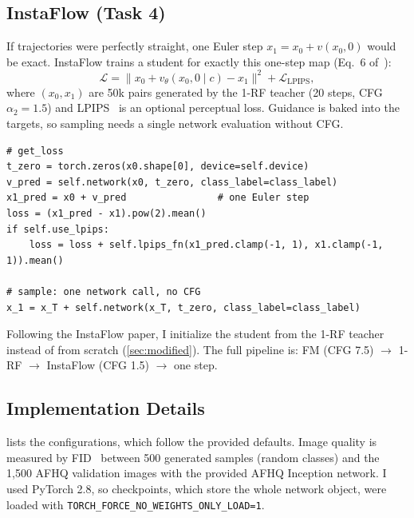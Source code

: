 \subsection{InstaFlow (Task 4)}
\label{sec:instaflow}
If trajectories were perfectly straight, one Euler step $x_1=x_0+v(x_0,0)$ would be exact.
InstaFlow trains a student for exactly this one-step map (Eq.~6 of~\cite{liu2024instaflow}):
\begin{equation}
  \mathcal L = \big\|x_0 + v_\theta(x_0,0\mid c) - x_1\big\|^2 + \mathcal L_{\text{LPIPS}},
\end{equation}
where $(x_0,x_1)$ are 50k pairs generated by the 1-RF teacher (20 steps, CFG $\alpha_2=1.5$) and LPIPS~\cite{zhang2018lpips} is an optional perceptual loss.
Guidance is baked into the targets, so sampling needs a single network evaluation without CFG.
\begin{lstlisting}
# get_loss
t_zero = torch.zeros(x0.shape[0], device=self.device)
v_pred = self.network(x0, t_zero, class_label=class_label)
x1_pred = x0 + v_pred                # one Euler step
loss = (x1_pred - x1).pow(2).mean()
if self.use_lpips:
    loss = loss + self.lpips_fn(x1_pred.clamp(-1, 1), x1.clamp(-1, 1)).mean()

# sample: one network call, no CFG
x_1 = x_T + self.network(x_T, t_zero, class_label=class_label)
\end{lstlisting}
Following the InstaFlow paper, I initialize the student from the 1-RF teacher instead of from scratch (\cref{sec:modified}).
The full pipeline is: FM (CFG 7.5) $\rightarrow$ 1-RF $\rightarrow$ InstaFlow (CFG 1.5) $\rightarrow$ one step.



\subsection{Implementation Details}
 lists the configurations, which follow the provided defaults.
Image quality is measured by FID~\cite{heusel2017fid} between 500 generated samples (random classes) and the 1,500 AFHQ validation images with the provided AFHQ Inception network.
I used PyTorch 2.8, so checkpoints, which store the whole network object, were loaded with \texttt{TORCH\_FORCE\_NO\_WEIGHTS\_ONLY\_LOAD=1}.
